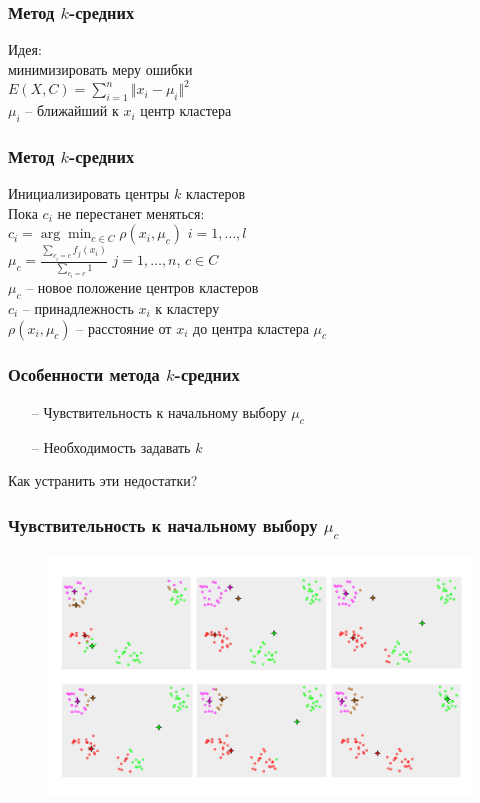 \documentclass[12pt]{beamer}
\begin{document}
\begin{frame}\frametitle{Метод $k$-средних}
Идея:\\  минимизировать меру ошибки\\
\vspace{5mm}${E(X, C) = \sum_{i = 1}^n \Vert x_i -\mu_i \Vert^2}$\\
\vspace{5mm}
$\mu_i$ -- ближайший к $x_i$ центр кластера
\end{frame}

\begin{frame}\frametitle{Метод $k$-средних}
Инициализировать центры $k$ кластеров \\
\vspace{2mm}
Пока $c_i$ не перестанет меняться:\\
\hspace{5mm} $c_i = \arg\min_{c \in C} \rho(x_i, \mu_c)$ \hspace{5mm} $i = 1,\dots, l$\\
\vspace{2mm}\hspace{5mm} ${\mu_c = \frac{\sum_{c_i = c} f_j(x_i)}{\sum_{c_i = c} 1} }$ \hspace{10mm} $j = 1,\dots, n$, $c \in C$\\
\vspace{2mm}
$\mu_c$ -- новое положение центров кластеров\\
$c_i$ -- принадлежность $x_i$ к кластеру\\
$\rho(x_i, \mu_c)$ -- расстояние от $x_i$ до центра кластера $\mu_c$
\end{frame}

\begin{frame}\frametitle{Особенности метода $k$-средних}
\begin{itemize}
\item[--] Чувствительность к начальному выбору $\mu_c$
\item[--] Необходимость задавать $k$
\end{itemize}
Как устранить эти недостатки?
\end{frame}

\begin{frame}\frametitle{Чувствительность к начальному выбору $\mu_c$}
\begin{figure}[htbp]
  \includegraphics[height=180pt, keepaspectratio = true]{images/K-means_convergence}  
\end{figure}
\end{frame}
\end{document}
